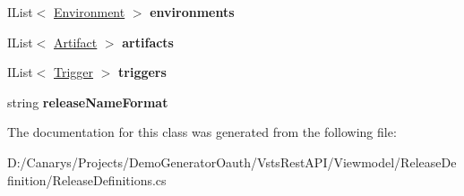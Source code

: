 \begin{DoxyCompactItemize}
\mbox{\label{class_vsts_rest_a_p_i_1_1_viewmodel_1_1_release_definition_1_1_release_definitions_1_1_release_definition_af0d5a51c64d23f535eed4e6ed710c29a}} 
I\+List$<$ \mbox{\hyperlink{class_vsts_rest_a_p_i_1_1_viewmodel_1_1_release_definition_1_1_release_definitions_1_1_environment}{Environment}} $>$ {\bfseries environments}
\item 
\mbox{\label{class_vsts_rest_a_p_i_1_1_viewmodel_1_1_release_definition_1_1_release_definitions_1_1_release_definition_aad87e117b9824e33d3b47f0716a12279}} 
I\+List$<$ \mbox{\hyperlink{class_vsts_rest_a_p_i_1_1_viewmodel_1_1_release_definition_1_1_release_definitions_1_1_artifact}{Artifact}} $>$ {\bfseries artifacts}
\item 
\mbox{\label{class_vsts_rest_a_p_i_1_1_viewmodel_1_1_release_definition_1_1_release_definitions_1_1_release_definition_a6cffa102464f4ea60c08401c4199a659}} 
I\+List$<$ \mbox{\hyperlink{class_vsts_rest_a_p_i_1_1_viewmodel_1_1_release_definition_1_1_release_definitions_1_1_trigger}{Trigger}} $>$ {\bfseries triggers}
\item 
\mbox{\label{class_vsts_rest_a_p_i_1_1_viewmodel_1_1_release_definition_1_1_release_definitions_1_1_release_definition_a721f12b3c1d4b6fd20586b9e4f7606c7}} 
string {\bfseries release\+Name\+Format}
\end{DoxyCompactItemize}


The documentation for this class was generated from the following file\+:\begin{DoxyCompactItemize}
\item 
D\+:/\+Canarys/\+Projects/\+Demo\+Generator\+Oauth/\+Vsts\+Rest\+A\+P\+I/\+Viewmodel/\+Release\+Definition/Release\+Definitions.\+cs\end{DoxyCompactItemize}

